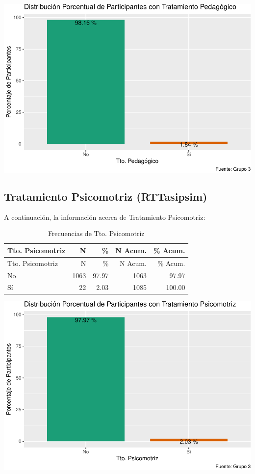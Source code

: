 \documentclass[
]{article}
\begin{document}
\includegraphics{Info_Dinix_02_files/figure-latex/30_RTTasiped-1.pdf}

\subsection{Tratamiento Psicomotriz
(RTTasipsim)}\label{tratamiento-psicomotriz-rttasipsim}

A continuación, la información acerca de Tratamiento Psicomotriz:

\begin{longtable}[]{@{}lrrrr@{}}
\caption{Frecuencias de Tto. Psicomotriz}\tabularnewline
\toprule\noalign{}
Tto. Psicomotriz & N & \% & N Acum. & \% Acum. \\
\midrule\noalign{}
\endfirsthead
\toprule\noalign{}
Tto. Psicomotriz & N & \% & N Acum. & \% Acum. \\
\midrule\noalign{}
\endhead
\bottomrule\noalign{}
\endlastfoot
No & 1063 & 97.97 & 1063 & 97.97 \\
Sí & 22 & 2.03 & 1085 & 100.00 \\
\end{longtable}

\includegraphics{Info_Dinix_02_files/figure-latex/30_RTTasipsim-1.pdf}
\end{document}
